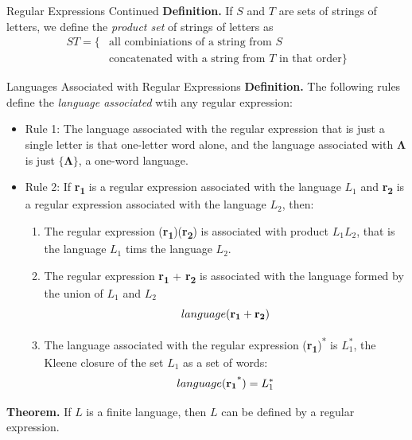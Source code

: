 \documentclass{article}
\begin{document}
\begin{multicols*}{3}
\begin{blackbox}{Regular Expressions Continued}
    \textbf{Definition.} If $S$ and $T$ are sets of strings of letters, we define the \emph{product set} of strings of letters as
    \vspace{-1.5ex}
    \begin{align*}
        ST = \{&\text{all combiniations of a string from $S$}\\
        &\text{concatenated with a string from $T$ in that order}\}
    \end{align*}
    \vspace{-4ex}
    \begin{redbox}{Languages Associated with Regular Expressions}
        \textbf{Definition.} The following rules define the \emph{language associated} wtih any regular expression:
        \begin{itemize}[leftmargin=0.5cm, itemsep=0.15ex]
            \item Rule 1: The language associated with the regular expression that is just a single letter is that one-letter word alone, and the language associated with $\boldsymbol{\Lambda}$ is just $\{\boldsymbol{\Lambda
            }\}$, a one-word language.
            \item Rule 2: If \textbf{r\textsubscript{1}} is a regular expression associated with the language $L_1$ and \textbf{r\textsubscript{2}} is a regular expression associated with the language $L_2$, then:
            {\footnotesize
            \begin{enumerate}[leftmargin=0.3cm,label=(\roman*), itemsep=0.25ex]
                \item The regular expression (\textbf{r\textsubscript{1}})(\textbf{r\textsubscript{2}}) is associated with product $L_1L_2$, that is the language $L_1$ tims the language $L_2$.
                \item The regular expression \textbf{r\textsubscript{1}} + \textbf{r\textsubscript{2}} is associated with the language formed by the union of $L_1$ and $L_2$\\[-2.5ex]
                \[language(\textbf{r\textsubscript{1}} + \textbf{r\textsubscript{2}})\]
                \item The language associated with the regular expression (\textbf{r\textsubscript{1}})\textsuperscript{*} is $L_1^*$, the Kleene closure of the set $L_1$ as a set of words: \\[-3ex]
                \[language(\textbf{r\textsubscript{1}}\textsuperscript{*}) = L_1^*\]
            \end{enumerate}
            }
        \end{itemize}
    \end{redbox}
    \textbf{Theorem.} If $L$ is a finite language, then $L$ can be defined by a regular expression.
\end{blackbox}


\end{multicols*}
\end{document}
